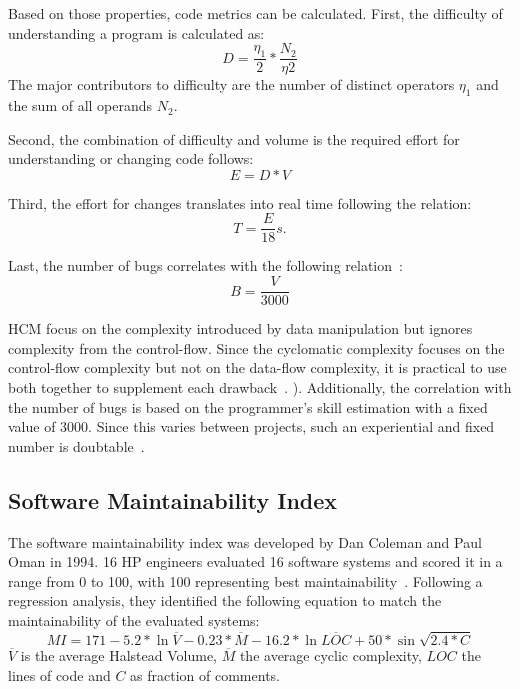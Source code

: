 Based on those properties, code metrics can be calculated. 
First, the difficulty of understanding a program is calculated as:
\begin{displaymath}
    D = \frac{\eta_1}{2} * \frac{N_2}{\eta2}
\end{displaymath}
The major contributors to difficulty are the number of distinct operators $\eta_1$ and the sum of all operands $N_2$.

Second, the combination of difficulty and volume is the required effort for understanding or changing code follows:
\begin{displaymath}
    E = D * V
\end{displaymath}

Third, the effort for changes translates into real time following the relation:
\begin{displaymath}
    T = \frac{E}{18}s.
\end{displaymath}

Last, the number of bugs correlates with the following relation~\cite{yu_survey_2010}:
\begin{displaymath}
    B = \frac{V}{3000}
\end{displaymath}

HCM focus on the complexity introduced by data manipulation but ignores complexity from the control-flow. Since the cyclomatic complexity focuses on the control-flow complexity but not on the data-flow complexity, it is practical to use both together to supplement each drawback~\cite{yu_survey_2010}.
). Additionally, the correlation with the number of bugs is based on the programmer's skill estimation with a fixed value of 3000. Since this varies between projects, such an experiential and fixed number is doubtable~\cite{yu_survey_2010}.

\subsection{Software Maintainability Index}
The software maintainability index was developed by Dan Coleman and Paul Oman in 1994. 16 HP engineers evaluated 16 software systems and scored it in a range from 0 to 100, with 100 representing best maintainability~\cite{coleman_using_1994}. 
Following a regression analysis, they identified the following equation to match the maintainability of the evaluated systems:
\begin{displaymath}
MI = 171 - 5.2 *\ln{\overline{V}} - 0.23 * \overline{M} - 16.2 * \ln{\overline{LOC}} + 50 * \sin{\sqrt{2.4 * C}}
\end{displaymath}
$\overline{V}$ is the average Halstead Volume, $\overline{M}$ the average cyclic complexity, $LOC$ the lines of code and $C$ as fraction of comments.

